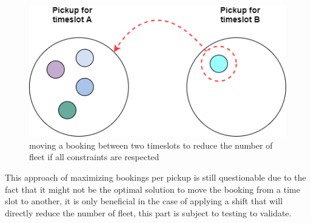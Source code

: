 \documentclass{article}
\begin{document}
\begin{figure}[H]
    \centering 
  \includegraphics[width=0.7\linewidth]{pictures/Timeslot}
  \caption{moving a booking between two timeslots to reduce the number of fleet if all constraints are respected}
\label{fig:timelsot}
\end{figure}



This approach of maximizing bookings per pickup is still questionable due to the fact that it might not be the optimal solution to move the booking from a time slot to another, it is only beneficial in the case of applying a shift that will directly reduce the number of fleet, this part is subject to testing to validate. 
\end{document}
